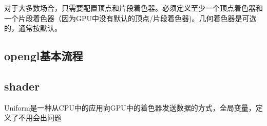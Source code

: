 \documentclass[UTF8]{article}
\begin{document}
对于大多数场合，只需要配置顶点和片段着色器。必须定义至少一个顶点着色器和一个片段着色器（因为GPU中没有默认的顶点/片段着色器)。几何着色器是可选的，通常按默认。

\subsection{opengl基本流程}
\begin{comment}
    // opengl程序流程
/*
    // :: 初始化代码（只运行一次,除非物体频繁改变） ::
    // 1. 绑定顶点数组对象VAO
    glBindVertexArray(VAO);
    // 2. 把顶点数组复制到缓冲中供OpenGL使用
    glBindBuffer(GL_ARRAY_BUFFER, VBO);
    glBufferData(GL_ARRAY_BUFFER, sizeof(vertices), vertices, GL_STATIC_DRAW);
    // 3. 复制索引数组到一个索引缓冲中供OpenGL使用
    glBindBuffer(GL_ELEMENT_ARRAY_BUFFER, EBO);
    glBufferData(GL_ELEMENT_ARRAY_BUFFER, sizeof(indices), indices, GL_STATIC_DRAW);
    // 4. 设置顶点属性指针
    glVertexAttribPointer(0, 3, GL_FLOAT, GL_FALSE, 3 * sizeof(float), (void*)0);
    glEnableVertexAttribArray(0);

    [...]

    // :: 绘制代码（渲染循环中） :: 
    // 5. 绘制物体
    glUseProgram(shaderProgram);
    glBindVertexArray(VAO);
    glDrawElements(GL_TRIANGLES, 6, GL_UNSIGNED_INT, 0)
    glBindVertexArray(0);

*/


\end{comment}


\subsection{shader}
\begin{comment}
    // 着色器结构
/*
    #version version_number
    in type in_variable_name;//每个输入变量叫顶点属性(Vertex Attribute)
    //OpenGL确保至少有16个包含4分量的顶点属性可用.以下三行注释代码可查询具体的顶点属性个数
    //int nrAttributes;
    //glGetIntegerv(GL_MAX_VERTEX_ATTRIBS, &nrAttributes);
    //std::cout << "Maximum nr of vertex attributes supported: " << nrAttributes << std::endl;

    in type in_variable_name;

    out type out_variable_name;

    uniform type uniform_name;

    int main()
    {
    // 处理输入并进行一些图形操作
    ...
    // 输出处理过的结果到输出变量
    out_variable_name = weird_stuff_we_processed;
    }

*/
\end{comment}
Uniform是一种从CPU中的应用向GPU中的着色器发送数据的方式，全局变量，定义了不用会出问题
\end{document}
